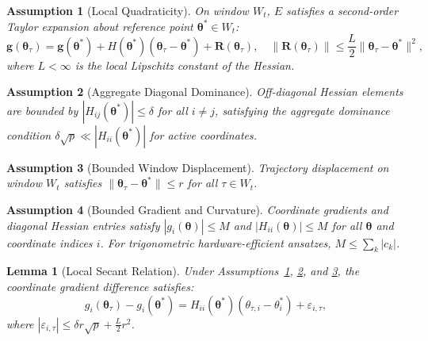 \documentclass[11pt,a4paper]{article}
\newtheorem{lemma}{Lemma}
\newtheorem{assumption}{Assumption}
\begin{document}
\begin{assumption}[Local Quadraticity]
\label{ass:quadraticity}
On window $W_t$, $E$ satisfies a second-order Taylor expansion about reference point $\boldsymbol{\theta}^* \in W_t$:
\begin{equation}
\mathbf{g}(\boldsymbol{\theta}_\tau) = \mathbf{g}(\boldsymbol{\theta}^*) + H(\boldsymbol{\theta}^*)(\boldsymbol{\theta}_\tau - \boldsymbol{\theta}^*) + \mathbf{R}(\boldsymbol{\theta}_\tau), \quad \|\mathbf{R}(\boldsymbol{\theta}_\tau)\| \le \frac{L}{2} \|\boldsymbol{\theta}_\tau - \boldsymbol{\theta}^*\|^2,
\end{equation}
where $L < \infty$ is the local Lipschitz constant of the Hessian.
\end{assumption}

\begin{assumption}[Aggregate Diagonal Dominance]
\label{ass:diag_dominance}
Off-diagonal Hessian elements are bounded by $|H_{ij}(\boldsymbol{\theta}^*)| \le \delta$ for all $i \ne j$, satisfying the aggregate dominance condition $\delta \sqrt{p} \ll |H_{ii}(\boldsymbol{\theta}^*)|$ for active coordinates.
\end{assumption}

\begin{assumption}[Bounded Window Displacement]
\label{ass:displacement}
Trajectory displacement on window $W_t$ satisfies $\|\boldsymbol{\theta}_\tau - \boldsymbol{\theta}^*\| \le r$ for all $\tau \in W_t$.
\end{assumption}

\begin{assumption}[Bounded Gradient and Curvature]
\label{ass:bounded_curvature}
Coordinate gradients and diagonal Hessian entries satisfy $|g_i(\boldsymbol{\theta})| \le M$ and $|H_{ii}(\boldsymbol{\theta})| \le M$ for all $\boldsymbol{\theta}$ and coordinate indices $i$. For trigonometric hardware-efficient ansatzes, $M \le \sum_k |c_k|$.
\end{assumption}

\begin{lemma}[Local Secant Relation]
\label{lem:secant}
Under Assumptions~\ref{ass:quadraticity}, \ref{ass:diag_dominance}, and \ref{ass:displacement}, the coordinate gradient difference satisfies:
\begin{equation}
g_i(\boldsymbol{\theta}_\tau) - g_i(\boldsymbol{\theta}^*) = H_{ii}(\boldsymbol{\theta}^*)(\theta_{\tau,i} - \theta_i^*) + \varepsilon_{i,\tau},
\end{equation}
where $|\varepsilon_{i,\tau}| \le \delta r \sqrt{p} + \frac{L}{2} r^2$.
\end{lemma}
\end{document}

